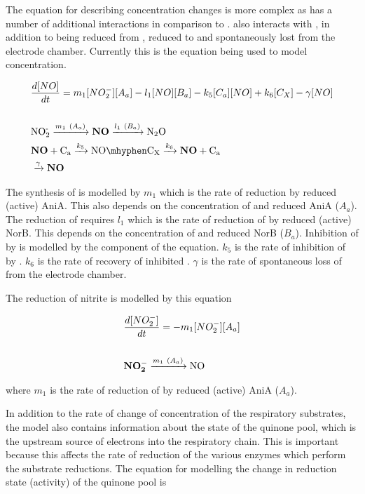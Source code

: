 The equation for describing \cNO{} concentration changes is more complex as \cNO{} has a number of additional interactions in comparison to \cOxygen{}. \cNO{} also interacts with \cbbthree{}, in addition to being reduced from \cNitrite{}, reduced to \cNtwoO{} and spontaneously lost from the electrode chamber. Currently this is the equation being used to model \cNO{} concentration.

\begin{eqnarray}
&\frac{d[NO]}{dt} = m_{1}[NO_2^-][A_a] - l_1[NO][B_a] - k_5[C_a][NO] + k_6 [C_X] - \gamma[NO] \nonumber \\\nonumber \\
&\textnormal{NO$_\textnormal{2}^\textnormal{-}$} \xrightarrow{m_1~(A_a)} \mathbf{NO} \xrightarrow{l_1~(B_a)} \textnormal{N$_\textnormal{2}$O} \nonumber \\
&\mathbf{NO} + \textnormal{C$_\textnormal{a}$} \xrightarrow{k_5} \textnormal{NO}\mhyphen \textnormal{C$_\textnormal{X}$} \xrightarrow{k_6} \mathbf{NO} + \textnormal{C$_\textnormal{a}$} \nonumber \\
&\xrightarrow{\gamma} \mathbf{NO}
\label{eq:no}
\end{eqnarray}

The synthesis of \cNO{} is modelled by $m_{1}$ which is the rate of \cNitrite{} reduction by reduced (active) AniA. This also depends on the concentration of \cNitrite{} and reduced AniA ($A_a$). The reduction of \cNO{} requires $l_1$ which is the rate of reduction of \cNO{} by reduced (active) NorB. This depends on the concentration of \cNO{} and reduced NorB ($B_a$). Inhibition of \cbbthree{} by \cNO{} is modelled by the  component of the equation. $k_5$ is the rate of inhibition of \cbbthree{} by \cNO{}. $k_6$ is the rate of recovery of inhibited \cbbthree{}. $\gamma$ is the rate of spontaneous loss of \cNO{} from the electrode chamber.

The reduction of nitrite is modelled by this equation

\begin{eqnarray}
&\frac{d[NO_2^-]}{dt} = - m_{1}[NO_2^-][A_a] \nonumber \\\nonumber \\
&\mathbf{NO_2^-} \xrightarrow{m_1~(A_a)} \textnormal{NO}
\label{eq:nitrite}
\end{eqnarray}

where $m_{1}$ is the rate of reduction of \cNitrite{} by reduced (active) AniA ($A_a$).

In addition to the rate of change of concentration of the respiratory substrates, the model also contains information about the state of the quinone pool, which is the upstream source of electrons into the respiratory chain. This is important because this affects the rate of reduction of the various enzymes which perform the substrate reductions. The equation for modelling the change in reduction state (activity) of the quinone pool is

